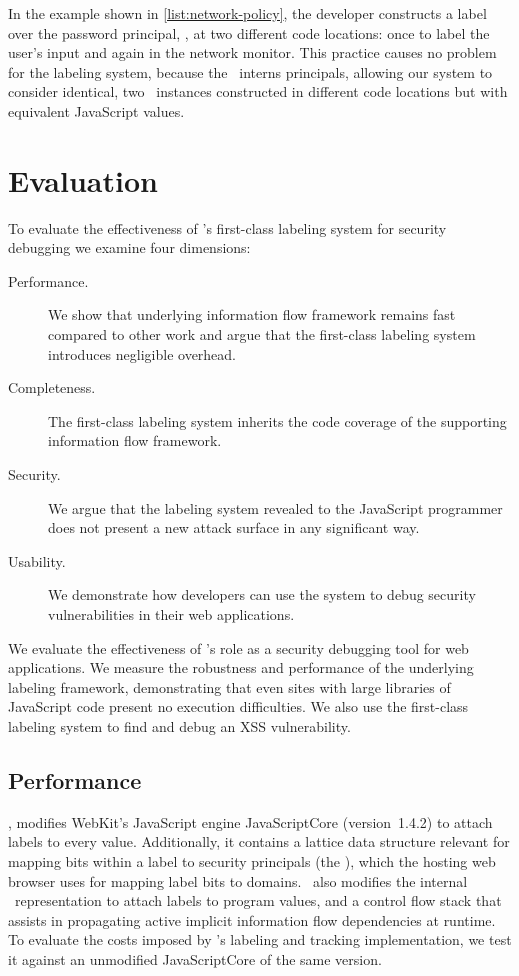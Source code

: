 In the example shown in \autoref{list:network-policy}, the developer constructs a label over the password principal, , at two different code locations: once to label the user's input and again in the network monitor.
This practice causes no problem for the labeling system, because the \FlowLabelRegistry\ interns principals, allowing our system to consider identical, two \FlowLabelObject\ instances constructed in different code locations but with equivalent JavaScript values.

\section{Evaluation}
\label{sec:first-class-evaluation}

To evaluate the effectiveness of \JitFlow's first-class labeling system for security debugging we examine four dimensions:
\begin{description}
\item[Performance.] We show that underlying information flow framework remains fast compared to other work and argue that the first-class labeling system introduces negligible overhead.
\item[Completeness.] The first-class labeling system inherits the code coverage of the supporting information flow framework.
\item[Security.] We argue that the labeling system revealed to the JavaScript programmer does not present a new attack surface in any significant way.
\item[Usability.] We demonstrate how developers can use the system to debug security vulnerabilities in their web applications.
\end{description}

We evaluate the effectiveness of \JitFlow's role as a security debugging tool for web applications.
We measure the robustness and performance of the underlying labeling framework, demonstrating that even sites with large libraries of JavaScript code present no execution difficulties.
We also use the first-class labeling system to find and debug an XSS vulnerability.

\subsection{Performance}
\label{sec:first-class-performance}

\JitFlow, modifies WebKit's JavaScript engine JavaScriptCore (version~1.4.2) to attach labels to every value.
Additionally, it contains a lattice data structure relevant for mapping bits within a label to security principals (the \FlowLabelRegistry), which the hosting web browser uses for mapping label bits to domains.
\JitFlow\ also modifies the internal \JSValue\ representation to attach labels to program values, and a control flow stack that assists in propagating active implicit information flow dependencies at runtime.
To evaluate the costs imposed by \JitFlow's labeling and tracking implementation, we test it against an unmodified JavaScriptCore of the same version.

